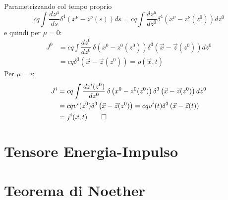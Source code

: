 \documentclass[12pt,a4paper,titlepage, twoside, openright]{book}
\newenvironment{proof:}[1][\proofname]{  %
 \begin{tcolorbox}[
	breakable, 
	enhanced, 
	interior hidden, 
	frame hidden, 
	borderline west = {1pt}{0pt}{gray}, 
	top=0pt, bottom=0pt, left=0pt]
\begin{proof}[#1:]~
}
{
\end{proof}
\end{tcolorbox}
}
\numberwithin{equation}{chapter}
\begin{document}
\begin{proof:}
Parametrizzando col tempo proprio
\[
cq \int \dfrac{d z^\mu}{ds}\delta^{4}(x^\nu-z^\nu(s)) ds = cq \int \dfrac{d z^\mu}{dz^0}\delta^{4} \left( x^\nu-z^\nu(z^0) \right) dz^0
\]
e quindi per $\mu=0$:
\begin{align*}
J^0 & = cq \int \dfrac{d z^0}{dz^0} \> \delta\left( x^0-z^0(z^0) \right) \delta^{3}\left( \vec{x}-\vec{z}(z^0) \right) dz^0
\\&= cq \delta^{3}\left( \vec{x}-\vec{z}(z^0) \right) =\rho(\vec{x},t)
\end{align*}
Per $\mu=i$:
\begin{align*}
J^i & = cq \int \dfrac{d z^i(z^0)}{dz^0} \> \delta\left( x^0-z^0(z^0) \right) \delta^{3}\left( \vec{x}-\vec{z}(z^0) \right) dz^0
\\ & = cq v^i(z^0) \delta^{3}\left( \vec{x}-\vec{z}(z^0) \right) = cq v^i(t) \delta^{3}\left( \vec{x}-\vec{z}(t) \right) \\ & = j^i(\vec{x},t) \qedhere
\end{align*}
\end{proof:}


\chapter{Tensore Energia-Impulso}


\chapter{Teorema di Noether}
\end{document}
